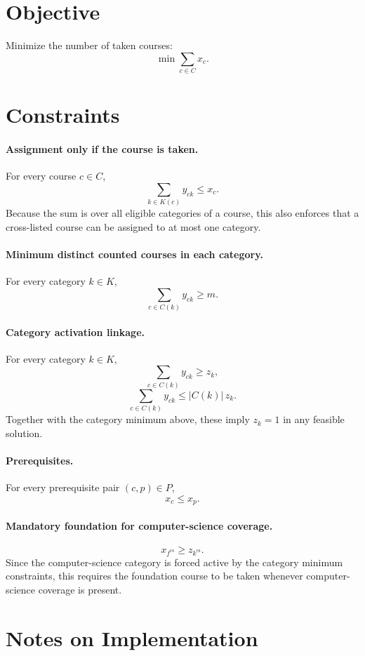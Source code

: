 \section*{Objective}

Minimize the number of taken courses:
\[
\min \sum_{c \in C} x_c.
\]

\section*{Constraints}

\paragraph{Assignment only if the course is taken.}
For every course $c \in C$,
\[
\sum_{k \in K(c)} y_{ck} \le x_c.
\]
Because the sum is over all eligible categories of a course, this also enforces that a cross-listed course can be assigned to at most one category.

\paragraph{Minimum distinct counted courses in each category.}
For every category $k \in K$,
\[
\sum_{c \in C(k)} y_{ck} \ge m.
\]

\paragraph{Category activation linkage.}
For every category $k \in K$,
\[
\sum_{c \in C(k)} y_{ck} \ge z_k,
\]
\[
\sum_{c \in C(k)} y_{ck} \le |C(k)|\, z_k.
\]
Together with the category minimum above, these imply $z_k=1$ in any feasible solution.

\paragraph{Prerequisites.}
For every prerequisite pair $(c,p) \in P$,
\[
x_c \le x_p.
\]

\paragraph{Mandatory foundation for computer-science coverage.}
\[
x_{f^{\text{cs}}} \ge z_{k^{\text{cs}}}.
\]
Since the computer-science category is forced active by the category minimum constraints, this requires the foundation course to be taken whenever computer-science coverage is present.

\section*{Notes on Implementation}

